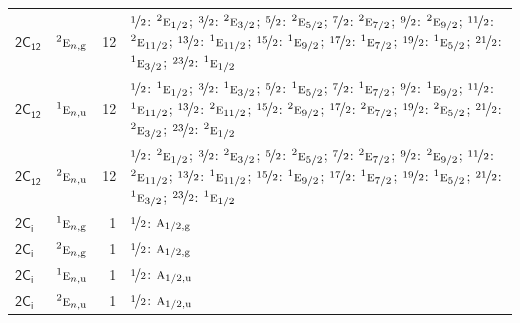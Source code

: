 \documentclass[10pt,a4paper]{article}
\numberwithin{equation}{section}
\newcommand{\grp}[1]{\mathsf{#1}}
\newcommand{\irr}[1]{\text{\normalfont\scshape #1}}
\newcommand{\conjpair}[1]{{}^{#1}}
\newcommand{\ptag}[1]{\mathrm{#1}}
\newlength{\fillwidth}\newlength{\cellwidth}\newlength{\colwidth}
\begin{document}
{\begin{longtable}{@{}llr>{\RaggedRight\arraybackslash}p{\fillwidth}@{}}
\href{2C12.pdf}{$\grp{2C_{12}}$} & $\conjpair{2}\irr{e}_{n,\ptag{g}}$ & 12 & $\nicefrac{1}{2}$: $\conjpair{2}\irr{e}_{1/2}$; $\nicefrac{3}{2}$: $\conjpair{2}\irr{e}_{3/2}$; $\nicefrac{5}{2}$: $\conjpair{2}\irr{e}_{5/2}$; $\nicefrac{7}{2}$: $\conjpair{2}\irr{e}_{7/2}$; $\nicefrac{9}{2}$: $\conjpair{2}\irr{e}_{9/2}$; $\nicefrac{11}{2}$: $\conjpair{2}\irr{e}_{11/2}$; $\nicefrac{13}{2}$: $\conjpair{1}\irr{e}_{11/2}$; $\nicefrac{15}{2}$: $\conjpair{1}\irr{e}_{9/2}$; $\nicefrac{17}{2}$: $\conjpair{1}\irr{e}_{7/2}$; $\nicefrac{19}{2}$: $\conjpair{1}\irr{e}_{5/2}$; $\nicefrac{21}{2}$: $\conjpair{1}\irr{e}_{3/2}$; $\nicefrac{23}{2}$: $\conjpair{1}\irr{e}_{1/2}$\\
\href{2C12.pdf}{$\grp{2C_{12}}$} & $\conjpair{1}\irr{e}_{n,\ptag{u}}$ & 12 & $\nicefrac{1}{2}$: $\conjpair{1}\irr{e}_{1/2}$; $\nicefrac{3}{2}$: $\conjpair{1}\irr{e}_{3/2}$; $\nicefrac{5}{2}$: $\conjpair{1}\irr{e}_{5/2}$; $\nicefrac{7}{2}$: $\conjpair{1}\irr{e}_{7/2}$; $\nicefrac{9}{2}$: $\conjpair{1}\irr{e}_{9/2}$; $\nicefrac{11}{2}$: $\conjpair{1}\irr{e}_{11/2}$; $\nicefrac{13}{2}$: $\conjpair{2}\irr{e}_{11/2}$; $\nicefrac{15}{2}$: $\conjpair{2}\irr{e}_{9/2}$; $\nicefrac{17}{2}$: $\conjpair{2}\irr{e}_{7/2}$; $\nicefrac{19}{2}$: $\conjpair{2}\irr{e}_{5/2}$; $\nicefrac{21}{2}$: $\conjpair{2}\irr{e}_{3/2}$; $\nicefrac{23}{2}$: $\conjpair{2}\irr{e}_{1/2}$\\
\href{2C12.pdf}{$\grp{2C_{12}}$} & $\conjpair{2}\irr{e}_{n,\ptag{u}}$ & 12 & $\nicefrac{1}{2}$: $\conjpair{2}\irr{e}_{1/2}$; $\nicefrac{3}{2}$: $\conjpair{2}\irr{e}_{3/2}$; $\nicefrac{5}{2}$: $\conjpair{2}\irr{e}_{5/2}$; $\nicefrac{7}{2}$: $\conjpair{2}\irr{e}_{7/2}$; $\nicefrac{9}{2}$: $\conjpair{2}\irr{e}_{9/2}$; $\nicefrac{11}{2}$: $\conjpair{2}\irr{e}_{11/2}$; $\nicefrac{13}{2}$: $\conjpair{1}\irr{e}_{11/2}$; $\nicefrac{15}{2}$: $\conjpair{1}\irr{e}_{9/2}$; $\nicefrac{17}{2}$: $\conjpair{1}\irr{e}_{7/2}$; $\nicefrac{19}{2}$: $\conjpair{1}\irr{e}_{5/2}$; $\nicefrac{21}{2}$: $\conjpair{1}\irr{e}_{3/2}$; $\nicefrac{23}{2}$: $\conjpair{1}\irr{e}_{1/2}$\\
\href{2S2.pdf}{$\grp{2C_{i}}$} & $\conjpair{1}\irr{e}_{n,\ptag{g}}$ & 1 & $\nicefrac{1}{2}$: $\irr{a}_{1/2,\ptag{g}}$\\
\href{2S2.pdf}{$\grp{2C_{i}}$} & $\conjpair{2}\irr{e}_{n,\ptag{g}}$ & 1 & $\nicefrac{1}{2}$: $\irr{a}_{1/2,\ptag{g}}$\\
\href{2S2.pdf}{$\grp{2C_{i}}$} & $\conjpair{1}\irr{e}_{n,\ptag{u}}$ & 1 & $\nicefrac{1}{2}$: $\irr{a}_{1/2,\ptag{u}}$\\
\href{2S2.pdf}{$\grp{2C_{i}}$} & $\conjpair{2}\irr{e}_{n,\ptag{u}}$ & 1 & $\nicefrac{1}{2}$: $\irr{a}_{1/2,\ptag{u}}$\\

\end{longtable}}
\end{document}

